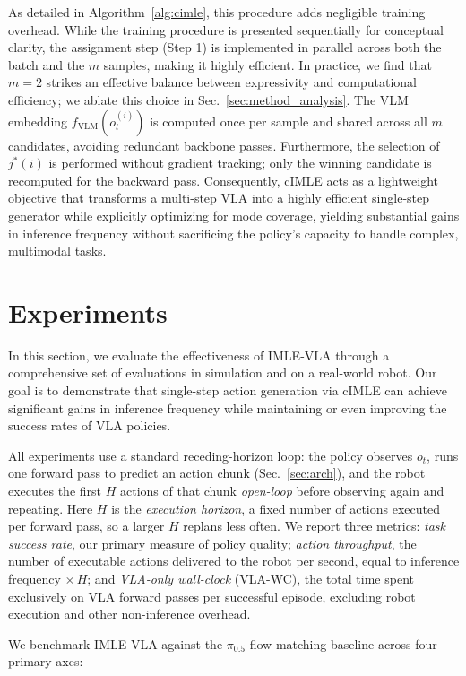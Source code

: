 \documentclass[letterpaper, 10 pt, conference]{ieeeconf}  %
\begin{document}
As detailed in Algorithm~\ref{alg:cimle}, this procedure adds negligible training overhead. While the training procedure is presented sequentially for conceptual clarity, the assignment step (Step 1) is implemented in parallel across both the batch and the $m$ samples, making it highly efficient. In practice, we find that $m{=}2$ strikes an effective balance between expressivity and computational efficiency; we ablate this choice in Sec.~\ref{sec:method_analysis}. The VLM embedding $f_{\mathrm{VLM}}(o_t^{(i)})$ is computed once per sample and shared across all $m$ candidates, avoiding redundant backbone passes. Furthermore, the selection of $j^{*}(i)$ is performed without gradient tracking; only the winning candidate is recomputed for the backward pass. Consequently, cIMLE acts as a lightweight objective that transforms a multi-step VLA into a highly efficient single-step generator while explicitly optimizing for mode coverage, yielding substantial gains in inference frequency without sacrificing the policy's capacity to handle complex, multimodal tasks.


\section{Experiments}\label{sec:experiments}

In this section, we evaluate the effectiveness of IMLE-VLA through a comprehensive set of evaluations in simulation and on a real-world robot. Our goal is to demonstrate that single-step action generation via cIMLE can achieve significant gains in inference frequency while maintaining or even improving the success rates of VLA policies.

All experiments use a standard receding-horizon loop: the policy observes $o_t$, runs one forward pass to predict an action chunk (Sec.~\ref{sec:arch}), and the robot executes the first $H$ actions of that chunk \emph{open-loop} before observing again and repeating. Here $H$ is the \emph{execution horizon}, a fixed number of actions executed per forward pass, so a larger $H$ replans less often. We report three metrics: \emph{task success rate}, our primary measure of policy quality; \emph{action throughput}, the number of executable actions delivered to the robot per second, equal to inference frequency $\times\,H$; and \emph{VLA-only wall-clock} (VLA-WC), the total time spent exclusively on VLA forward passes per successful episode, excluding robot execution and other non-inference overhead. 

We benchmark IMLE-VLA against the $\pi_{0.5}$ flow-matching baseline across four primary axes:
\end{document}
